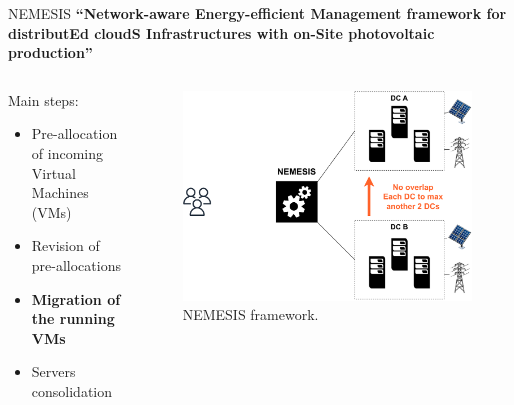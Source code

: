 \documentclass[Ligatures=TeX,table,svgnames,usetotalslideindicator,compress,10pt,aspectratio=169]{beamer}
\begin{document}
\begin{frame}{NEMESIS}
  \textbf {``\alert{N}etwork-aware \alert{E}nergy-efficient
    \alert{M}anagement framework for distribut\alert{E}d cloud\alert{S} \alert{I}nfrastructures with on-\alert{S}ite photovoltaic production''}
\begin{columns}        
    \begin{column}{0.4\textwidth}
Main steps:
\small
\begin{itemize}
    \item Pre-allocation of incoming Virtual Machines (VMs)
    \item Revision of pre-allocations
    \item \alert{\textbf{Migration of the running VMs}}
    \item Servers consolidation
\end{itemize}
\end{column}

\begin{column}{0.6\textwidth}
      \begin{figure}[!h]
        \centering
        \includegraphics[width=.85\textwidth]{images/nemesis_migration.pdf}
        \caption{NEMESIS framework.}
      \end{figure}
    \end{column}        

\end{columns}
\end{frame}
\end{document}
